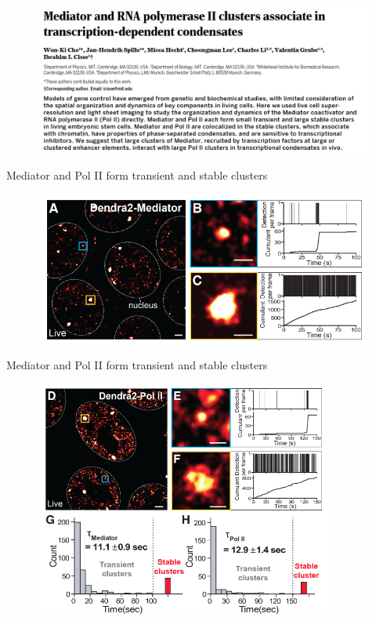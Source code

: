 \documentclass[aspectratio=1610]{beamer}					%
\begin{document}
\begin{frame}{}
\begin{figure}
\includegraphics[width=14cm]{abstract-1.png}
\end{figure}
\end{frame}


\begin{frame}{Mediator and Pol II form transient and stable clusters}
\begin{figure}
\includegraphics[width=14cm]{figure-1-1.png}
\end{figure}
\end{frame}


\begin{frame}{Mediator and Pol II form transient and stable clusters}
\begin{figure}
\includegraphics[width=10cm]{figure-1-2.png}
\end{figure}
\end{frame}
\end{document}
